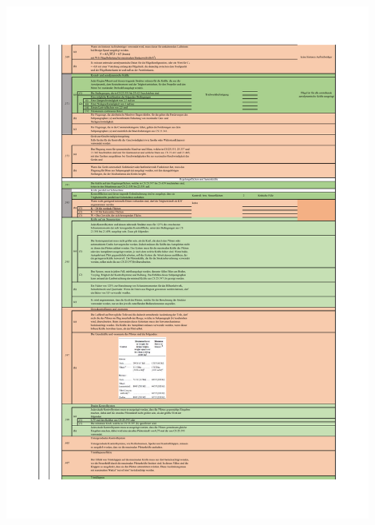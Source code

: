 \begin{table}[H]
\centering
\includegraphics[width=0.9\textwidth]{bilder/Tabellen/MPP_Konstruktion_4.pdf}
\end{table}

